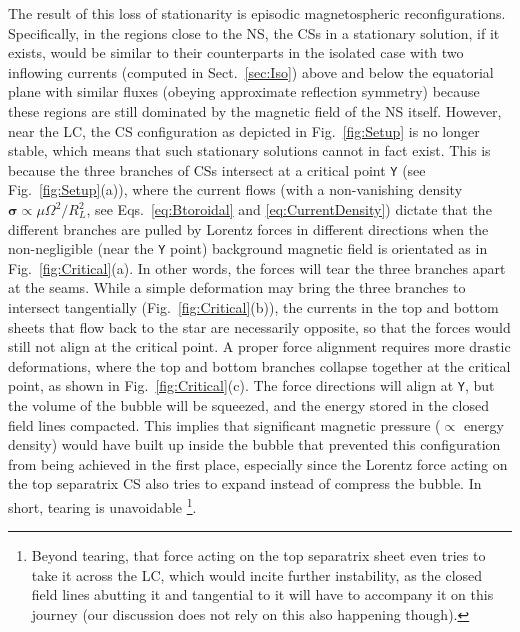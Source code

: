 \documentclass{aa}
\begin{document}
The result of this loss of stationarity is episodic magnetospheric reconfigurations. Specifically, in the regions close to the NS, the CSs in a stationary solution,
if it exists, would be similar to their counterparts in the isolated case with two inflowing currents (computed in Sect.~\ref{sec:Iso}) above and below the equatorial plane with similar fluxes (obeying approximate reflection symmetry) because these regions are still dominated by the magnetic field of the NS itself. However, near the LC, the CS configuration as depicted in Fig.~\ref{fig:Setup} is no longer stable, which means that such stationary solutions cannot in fact exist. This is because the three branches of CSs intersect at a critical point \verb!Y! (see Fig.~\ref{fig:Setup}(a)), where the current flows (with a non-vanishing density ${\bm \sigma} \propto \mu \Omega^2/R_L^2$, see Eqs.~\eqref{eq:Btoroidal} and \eqref{eq:CurrentDensity}) dictate that the different branches are pulled by Lorentz forces in different directions when the non-negligible (near the \verb!Y! point) background magnetic field is orientated as in Fig.~\ref{fig:Critical}(a). In other words, the forces will tear the three branches apart at the seams. While a simple deformation may bring the three branches to intersect tangentially (Fig.~\ref{fig:Critical}(b)), the currents in the top and bottom sheets that flow back to the star are necessarily opposite, so that the forces would still not align at the critical point. A proper force alignment requires more drastic deformations, where the top and bottom branches collapse together at the critical point, as shown in Fig.~\ref{fig:Critical}(c). The force directions will align at \verb!Y!, but the volume of the bubble will be squeezed, and the energy stored in the closed field lines compacted. This implies that significant magnetic pressure ($\propto$ energy density) would have built up inside the bubble that prevented this configuration from being achieved in the first place, especially since the Lorentz force acting on the top separatrix CS also tries to expand instead of compress the bubble. In short, tearing is unavoidable 
\footnote{Beyond tearing, that force acting on the top separatrix sheet even tries to take it across the LC, which would incite further instability, as the closed field lines abutting it and tangential to it will have to accompany it on this journey (our discussion does not rely on this also happening though).}.
\end{document}
